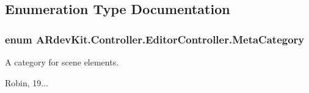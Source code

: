 \subsection{Enumeration Type Documentation}
\hypertarget{namespace_a_rdev_kit_1_1_controller_1_1_editor_controller_a304367964b3f3f5c115bb81e7b31d534}{
\subsubsection[{Meta\-Category}]{\setlength{\rightskip}{0pt plus 5cm}enum {\bf A\-Rdev\-Kit.\-Controller.\-Editor\-Controller.\-Meta\-Category}}}\label{namespace_a_rdev_kit_1_1_controller_1_1_editor_controller_a304367964b3f3f5c115bb81e7b31d534}


A category for scene elements. 

Robin, 19... 